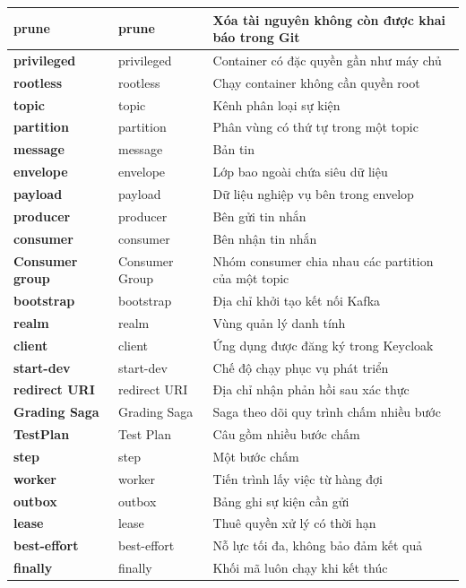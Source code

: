 \documentclass[../BTL.tex]{subfiles}
\begin{document}
\begin{longtable}{|p{3.2cm}|p{3.5cm}|p{7.1cm}|}
	\textbf{prune} & prune & Xóa tài nguyên không còn được khai báo trong Git\\ \hline
	\textbf{privileged} & privileged & Container có đặc quyền gần như máy chủ\\ \hline
	\textbf{rootless} & rootless & Chạy container không cần quyền root\\ \hline
	\textbf{topic} & topic & Kênh phân loại sự kiện\\ \hline
	\textbf{partition} & partition & Phân vùng có thứ tự trong một topic\\ \hline
	\textbf{message} & message & Bản tin\\ \hline
	\textbf{envelope} & envelope & Lớp bao ngoài chứa siêu dữ liệu\\ \hline
	\textbf{payload} & payload & Dữ liệu nghiệp vụ bên trong envelop\\ \hline
	\textbf{producer} & producer & Bên gửi tin nhắn\\ \hline
	\textbf{consumer} & consumer & Bên nhận tin nhắn\\ \hline
	\textbf{Consumer group} & Consumer Group & Nhóm consumer chia nhau các partition của một topic\\ \hline
	\textbf{bootstrap} & bootstrap & Địa chỉ khởi tạo kết nối Kafka\\ \hline
	\textbf{realm} & realm & Vùng quản lý danh tính\\ \hline
	\textbf{client} & client & Ứng dụng được đăng ký trong Keycloak\\ \hline
	\textbf{start-dev} & start-dev & Chế độ chạy phục vụ phát triển\\ \hline
	\textbf{redirect URI} & redirect URI & Địa chỉ nhận phản hồi sau xác thực\\ \hline
	\textbf{Grading Saga} & Grading Saga & Saga theo dõi quy trình chấm nhiều bước\\ \hline
	\textbf{TestPlan} & Test Plan & Câu gồm nhiều bước chấm\\ \hline
	\textbf{step} & step & Một bước chấm\\ \hline
	\textbf{worker} & worker & Tiến trình lấy việc từ hàng đợi\\ \hline
	\textbf{outbox} & outbox & Bảng ghi sự kiện cần gửi\\ \hline
	\textbf{lease} & lease & Thuê quyền xử lý có thời hạn\\ \hline
	\textbf{best-effort} & best-effort & Nỗ lực tối đa, không bảo đảm kết quả\\ \hline
	\textbf{finally} & finally & Khối mã luôn chạy khi kết thúc\\ \hline

\end{longtable}
\end{document}

